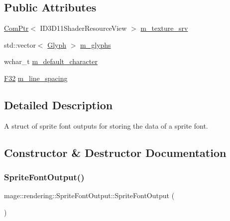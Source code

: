 \subsection*{Public Attributes}
\begin{DoxyCompactItemize}
\item 
\hyperlink{namespacemage_ae74f374780900893caa5555d1031fd79}{Com\+Ptr}$<$ I\+D3\+D11\+Shader\+Resource\+View $>$ \hyperlink{structmage_1_1rendering_1_1_sprite_font_output_ab074e7aa56a34898b19172615085045d}{m\+\_\+texture\+\_\+srv}
\item 
std\+::vector$<$ \hyperlink{structmage_1_1rendering_1_1_glyph}{Glyph} $>$ \hyperlink{structmage_1_1rendering_1_1_sprite_font_output_a3ff626faa883b00e94e5dddf94fb013e}{m\+\_\+glyphs}
\item 
wchar\+\_\+t \hyperlink{structmage_1_1rendering_1_1_sprite_font_output_af35542b71c315b2ed6059ab53413d34c}{m\+\_\+default\+\_\+character}
\item 
\hyperlink{namespacemage_aa97e833b45f06d60a0a9c4fc22ae02c0}{F32} \hyperlink{structmage_1_1rendering_1_1_sprite_font_output_a808965bc4ade482ffac0f56bf8013933}{m\+\_\+line\+\_\+spacing}
\end{DoxyCompactItemize}


\subsection{Detailed Description}
A struct of sprite font outputs for storing the data of a sprite font. 

\subsection{Constructor \& Destructor Documentation}
\hypertarget{structmage_1_1rendering_1_1_sprite_font_output_a5bc62257f436c6836a8fd0b3c306c026}{}\label{structmage_1_1rendering_1_1_sprite_font_output_a5bc62257f436c6836a8fd0b3c306c026} 
\subsubsection{\texorpdfstring{Sprite\+Font\+Output()}{SpriteFontOutput()}\hspace{0.1cm}{\footnotesize\ttfamily [1/3]}}
{\footnotesize\ttfamily mage\+::rendering\+::\+Sprite\+Font\+Output\+::\+Sprite\+Font\+Output (\begin{DoxyParamCaption}{ }\end{DoxyParamCaption})\hspace{0.3cm}{\ttfamily [default]}}

